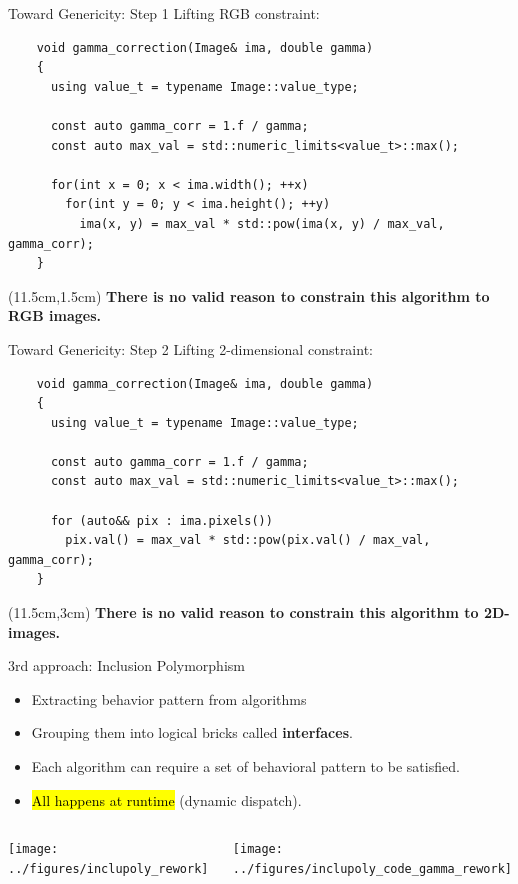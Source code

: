 \documentclass[12pt,aspectratio=169]{beamer}
\makeatletter
\let\HL\hl
\renewcommand\hl{%
  \let\set@color\beamerorig@set@color
  \let\reset@color\beamerorig@reset@color
  \HL}
\makeatother
\begin{document}
\begin{frame}[fragile]{Toward Genericity: Step 1}
  Lifting RGB constraint:
  \begin{verbatim}
    void gamma_correction(Image& ima, double gamma)
    {
      using value_t = typename Image::value_type;

      const auto gamma_corr = 1.f / gamma;
      const auto max_val = std::numeric_limits<value_t>::max();
    
      for(int x = 0; x < ima.width(); ++x)
        for(int y = 0; y < ima.height(); ++y)
          ima(x, y) = max_val * std::pow(ima(x, y) / max_val, gamma_corr);
    }
  \end{verbatim}
  \begin{textblock*}{4cm}(11.5cm,1.5cm)
    \textbf{There is no valid reason to constrain this algorithm to RGB images.}
  \end{textblock*}
\end{frame}

\begin{frame}[fragile]{Toward Genericity: Step 2}
  Lifting 2-dimensional constraint:
  \begin{verbatim}
    void gamma_correction(Image& ima, double gamma)
    {
      using value_t = typename Image::value_type;

      const auto gamma_corr = 1.f / gamma;
      const auto max_val = std::numeric_limits<value_t>::max();
    
      for (auto&& pix : ima.pixels())
        pix.val() = max_val * std::pow(pix.val() / max_val, gamma_corr);
    }
  \end{verbatim}
  \begin{textblock*}{4cm}(11.5cm,3cm)
    \textbf{There is no valid reason to constrain this algorithm to 2D-images.}
  \end{textblock*}
\end{frame}

\begin{frame}[fragile]{3rd approach: Inclusion Polymorphism}
  \begin{itemize}
    \item Extracting behavior pattern from algorithms
    \item Grouping them into logical bricks called \textbf{interfaces}.
    \item Each algorithm can require a set of behavioral pattern to be satisfied.
    \item \hl{All happens at runtime} (dynamic dispatch).
  \end{itemize}

  \begin{columns}[T,onlytextwidth]
    \centering
    \texttt{[image: ../figures/inclupoly\_rework]}

    \centering
    \texttt{[image: ../figures/inclupoly\_code\_gamma\_rework]}
  \end{columns}
\end{frame}
\end{document}
